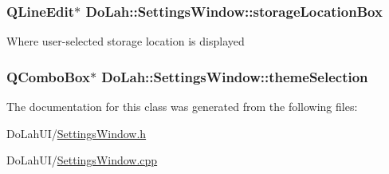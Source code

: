 \subsubsection[{storage\+Location\+Box}]{\setlength{\rightskip}{0pt plus 5cm}Q\+Line\+Edit$\ast$ Do\+Lah\+::\+Settings\+Window\+::storage\+Location\+Box}\label{class_do_lah_1_1_settings_window_a3154c430f280084ab4d9b558ff4d623a}
Where user-\/selected storage location is displayed \hypertarget{class_do_lah_1_1_settings_window_a6a18dc1bafd9e46b696584dbba064db5}{}
\subsubsection[{theme\+Selection}]{\setlength{\rightskip}{0pt plus 5cm}Q\+Combo\+Box$\ast$ Do\+Lah\+::\+Settings\+Window\+::theme\+Selection\hspace{0.3cm}{\ttfamily [private]}}\label{class_do_lah_1_1_settings_window_a6a18dc1bafd9e46b696584dbba064db5}


The documentation for this class was generated from the following files\+:\begin{DoxyCompactItemize}
\item 
Do\+Lah\+U\+I/\hyperlink{_settings_window_8h}{Settings\+Window.\+h}\item 
Do\+Lah\+U\+I/\hyperlink{_settings_window_8cpp}{Settings\+Window.\+cpp}\end{DoxyCompactItemize}
